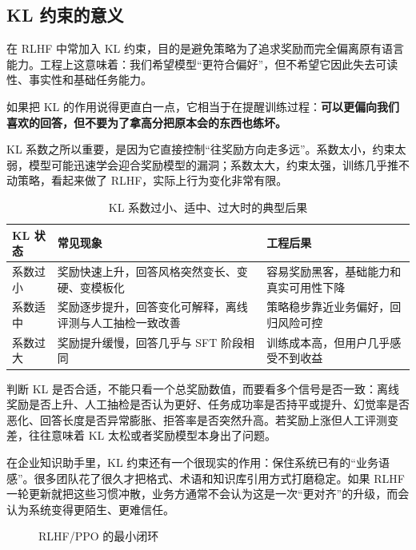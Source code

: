 \subsection{KL 约束的意义}
在 RLHF 中常加入 KL 约束，目的是避免策略为了追求奖励而完全偏离原有语言能力。工程上这意味着：我们希望模型“更符合偏好”，但不希望它因此失去可读性、事实性和基础任务能力。

如果把 KL 的作用说得更直白一点，它相当于在提醒训练过程：\textbf{可以更偏向我们喜欢的回答，但不要为了拿高分把原本会的东西也练坏。}

KL 系数之所以重要，是因为它直接控制“往奖励方向走多远”。系数太小，约束太弱，模型可能迅速学会迎合奖励模型的漏洞；系数太大，约束太强，训练几乎推不动策略，看起来做了 RLHF，实际上行为变化非常有限。

\begin{table}[H]
\centering
\small
\begin{tabularx}{\textwidth}{>{\raggedright\arraybackslash}p{2.6cm}>{\raggedright\arraybackslash}X>{\raggedright\arraybackslash}X}
\toprule
\textbf{KL 状态} & \textbf{常见现象} & \textbf{工程后果} \\
\midrule
系数过小 & 奖励快速上升，回答风格突然变长、变硬、变模板化 & 容易奖励黑客，基础能力和真实可用性下降 \\
系数适中 & 奖励逐步提升，回答变化可解释，离线评测与人工抽检一致改善 & 策略稳步靠近业务偏好，回归风险可控 \\
系数过大 & 奖励提升缓慢，回答几乎与 SFT 阶段相同 & 训练成本高，但用户几乎感受不到收益 \\
\bottomrule
\end{tabularx}
\caption{KL 系数过小、适中、过大时的典型后果}
\label{tab:kl-effects}
\end{table}

判断 KL 是否合适，不能只看一个总奖励数值，而要看多个信号是否一致：离线奖励是否上升、人工抽检是否认为更好、任务成功率是否持平或提升、幻觉率是否恶化、回答长度是否异常膨胀、拒答率是否突然升高。若奖励上涨但人工评测变差，往往意味着 KL 太松或者奖励模型本身出了问题。

在企业知识助手里，KL 约束还有一个很现实的作用：保住系统已有的“业务语感”。很多团队花了很久才把格式、术语和知识库引用方式打磨稳定。如果 RLHF 一轮更新就把这些习惯冲散，业务方通常不会认为这是一次“更对齐”的升级，而会认为系统变得更陌生、更难信任。

\begin{figure}[H]
\centering
{}
\caption{RLHF/PPO 的最小闭环}
\label{fig:rlhf-loop}
\end{figure}


